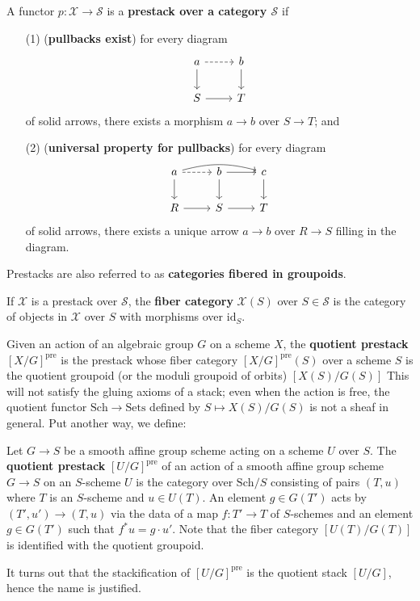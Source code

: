 \documentclass[12pt]{article}
\begin{document}
\begin{definition}[Prestacks]\label{def:prestacks}
  A functor $p:\mathcal{X}\to\mathcal{S}$ is a \textbf{prestack over a category $\mathcal{S}$} if
  \begin{enumerate}
    \item[(1)] (\textbf{pullbacks exist}) for every diagram
          \[
            \begin{tikzcd}
              a \arrow[d] \arrow[r, dashed] & b \arrow[d] \\
              S \arrow[r] & T
            \end{tikzcd}
          \]
          of solid arrows, there exists a morphism $a\to b$ over $S\to T$; and

    \item[(2)] (\textbf{universal property for pullbacks}) for every diagram
          \[
            \begin{tikzcd}
              a \arrow[d]
              \arrow[r, dashed]
              \arrow[rr, bend left=15] &
              b \arrow[d] \arrow[r] &
              c \arrow[d] \\
              R \arrow[r] & S \arrow[r] & T
            \end{tikzcd}
          \]
          of solid arrows, there exists a unique arrow $a\to b$ over $R\to S$ filling in the diagram.
  \end{enumerate}
  Prestacks are also referred to as \textbf{categories fibered in groupoids}.
\end{definition}

\begin{definition}\label{def:fibercat}
  If $\mathcal{X}$ is a prestack over $\mathcal{S}$, the \textbf{fiber category}
  $\mathcal{X}(S)$ over $S\in\mathcal{S}$ is the category of objects in $\mathcal{X}$ over $S$
  with morphisms over $\mathrm{id}_S$.
\end{definition}

Given an action of an algebraic group $G$ on a scheme $X$, the \textbf{quotient prestack} $[X/G]^{\mathrm{pre}}$ is the prestack whose fiber category
$[X/G]^{\mathrm{pre}}(S)$ over a scheme $S$ is the quotient groupoid (or the moduli groupoid of orbits) $[X(S)/G(S)]$
This will not satisfy the gluing axioms of a stack; even when the action is free,
the quotient functor $\mathrm{Sch} \to \mathrm{Sets}$ defined by $S \mapsto X(S)/G(S)$ is not a sheaf
in general. Put another way, we define:
\begin{definition}
  Let $G \to S$ be a smooth affine group scheme acting on a scheme $U$ over $S$.
  The \textbf{quotient prestack} $[U/G]^{\mathrm{pre}}$ of an action of a smooth affine group scheme $G \to S$
  on an $S$-scheme $U$ is the category over $\mathrm{Sch}/S$ consisting of pairs $(T,u)$ where $T$ is an $S$-scheme
  and $u \in U(T)$. An element $g \in G(T')$ acts by $(T',u') \to (T,u)$ via the data of a map $f:T'\to T$ of
  $S$-schemes and an element $g \in G(T')$ such that $f^*u = g \cdot u'$. Note that the fiber category
  $[U(T)/G(T)]$ is identified with the quotient groupoid.
\end{definition}
It turns out that the stackification of $[U/G]^{\mathrm{pre}}$ is the quotient stack $[U/G]$, hence the name is justified.
\end{document}
